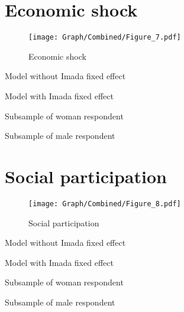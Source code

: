 \documentclass[10pt,a4paper]{article}
\begin{document}
\section{Economic shock}
\begin{table}[H]\centering

\end{table}
\begin{figure}[H]\centering
\texttt{[image: Graph/Combined/Figure\_7.pdf]}
\caption{Economic shock} \label{fig:Fig_7}
\end{figure}
\begin{table}[H]\centering\caption{Model without Imada fixed effect}

\end{table}
\begin{table}[H]\centering\caption{Model with Imada fixed effect}

\end{table}
\begin{table}[H]\centering\caption{Subsample of woman respondent}

\end{table}
\begin{table}[H]\centering\caption{Subsample of male respondent}

\end{table}
\pagebreak
\section{Social participation}
\begin{table}[H]\centering

\end{table}
\begin{figure}[H]\centering
\texttt{[image: Graph/Combined/Figure\_8.pdf]}
\caption{Social participation} \label{fig:Fig_8}
\end{figure}
\begin{table}[H]\centering\caption{Model without Imada fixed effect}

\end{table}
\begin{table}[H]\centering\caption{Model with Imada fixed effect}

\end{table}
\begin{table}[H]\centering\caption{Subsample of woman respondent}

\end{table}
\begin{table}[H]\centering\caption{Subsample of male respondent}

\end{table}
\pagebreak
\end{document}
